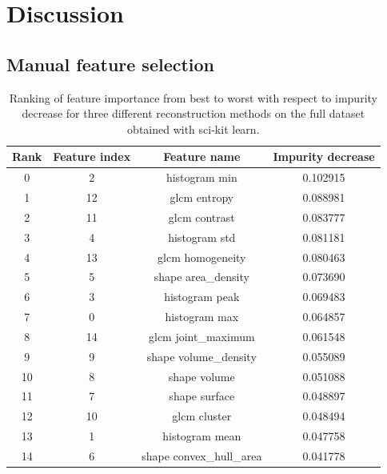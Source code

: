 \section{Discussion}

\subsection{Manual feature selection}


\begin{table}[H]
    \centering
    \caption{Ranking of feature importance from best to worst with respect to
    impurity decrease for three different reconstruction methods on the full
    dataset obtained with sci-kit learn.}  
    \label{tab:feature_importance}  

    \begin{tabular}{|c|c|c|c|}
        \hline
        Rank & Feature index & Feature name & Impurity decrease \\     
        \hline
        0       & 2           & histogram min  & 0.102915  \\
        1      & 12            & glcm entropy  & 0.088981  \\
        2      & 11           & glcm contrast  & 0.083777  \\
        3       & 4           & histogram std  & 0.081181  \\
        4      & 13        & glcm homogeneity  & 0.080463  \\
        5       & 5      & shape area\_density  & 0.073690  \\
        6       & 3          & histogram peak  & 0.069483  \\
        7       & 0           & histogram max  & 0.064857  \\
        8      & 14      & glcm joint\_maximum  & 0.061548  \\
        9       & 9    & shape volume\_density  & 0.055089  \\
        10      & 8            & shape volume  & 0.051088  \\
        11      & 7           & shape surface  & 0.048897  \\
        12     & 10            & glcm cluster  & 0.048494  \\
        13      & 1          & histogram mean  & 0.047758  \\
        14      & 6  & shape convex\_hull\_area  & 0.041778  \\
        \hline
         
    \end{tabular} 
\end{table}


